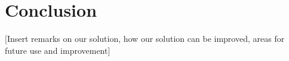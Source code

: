\section{Conclusion}
\label{sec:conclusion}
[Insert remarks on our solution, how our solution can be improved, areas for future use and improvement]


